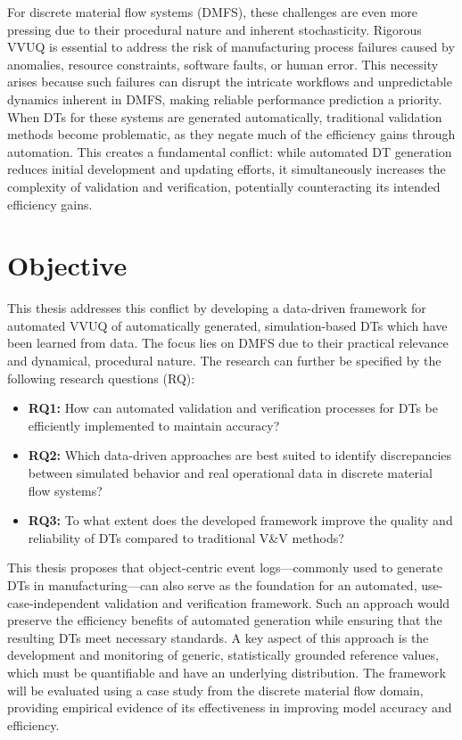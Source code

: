 For discrete material flow systems (DMFS), these challenges are even more pressing due to their procedural nature and inherent stochasticity. Rigorous VVUQ is essential to address the risk of manufacturing process failures caused by anomalies, resource constraints, software faults, or human error. This necessity arises because such failures can disrupt the intricate workflows and unpredictable dynamics inherent in DMFS, making reliable performance prediction a priority. When DTs for these systems are generated automatically, traditional validation methods become problematic, as they negate much of the efficiency gains through automation. This creates a fundamental conflict: while automated DT generation reduces initial development and updating efforts, it simultaneously increases the complexity of validation and verification, potentially counteracting its intended efficiency gains.

\section{Objective}

This thesis addresses this conflict by developing a data-driven framework for automated VVUQ of automatically generated, simulation-based DTs which have been learned from data. The focus lies on DMFS due to their practical relevance and dynamical, procedural nature. The research can further be specified by the following research questions (RQ):

\begin{itemize}
  \item \textbf{RQ1:} How can automated validation and verification processes for DTs be efficiently implemented to maintain accuracy?
  \item \textbf{RQ2:} Which data-driven approaches are best suited to identify discrepancies between simulated behavior and real operational data in discrete material flow systems?
  \item \textbf{RQ3:} To what extent does the developed framework improve the quality and reliability of DTs compared to traditional V&V methods?
\end{itemize}

This thesis proposes that object-centric event logs—commonly used to generate DTs in manufacturing—can also serve as the foundation for an automated, use-case-independent validation and verification framework. Such an approach would preserve the efficiency benefits of automated generation while ensuring that the resulting DTs meet necessary standards. A key aspect of this approach is the development and monitoring of generic, statistically grounded reference values, which must be quantifiable and have an underlying distribution. The framework will be evaluated using a case study from the discrete material flow domain, providing empirical evidence of its effectiveness in improving model accuracy and efficiency.

